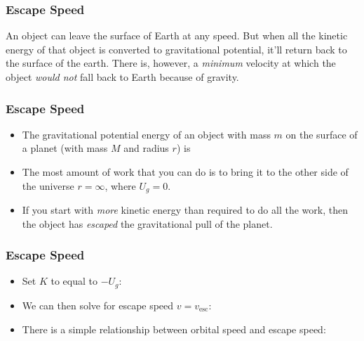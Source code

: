 \documentclass[12pt,compress,aspectratio=169]{beamer}
\begin{document}
\begin{frame}
  \frametitle{Escape Speed}
  An object can leave the surface of Earth at any speed. But when all the
  kinetic energy of that object is converted to gravitational potential, it'll
  return back to the surface of the earth. There is, however, a \emph{minimum}
  velocity at which the object \emph{would not} fall back to Earth because of
  gravity.
\end{frame}


\begin{frame}
  \frametitle{Escape Speed}
  \begin{itemize}
  \item The gravitational potential energy of an object with mass $m$ on the
    surface of a planet (with mass $M$ and radius $r$) is

  \item The most amount of work that you can do is to bring it to the other side
    of the universe $r=\infty$, where $U_g=0$.
  \item If you start with \emph{more} kinetic energy than required to do all
    the work, then the object has \emph{escaped} the gravitational pull of the
    planet.
  \end{itemize}
\end{frame}


\begin{frame}
  \frametitle{Escape Speed}
  \begin{itemize}
  \item Set $K$ to equal to $-U_g$:
    
  \item We can then solve for escape speed $v=v_\mathrm{esc}$:


  \item There is a simple relationship between orbital speed and escape
    speed:

  \end{itemize}
\end{frame}
\end{document}
